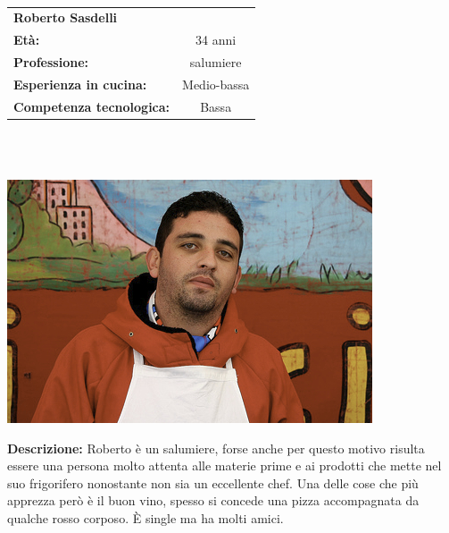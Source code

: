 \hrulefill\\
\begin{minipage}{.75\textwidth}
\begin{tabular}{l | c}
	\textbf{Roberto Sasdelli} & \\
	\textbf{Età:} & 34 anni\\
	\textbf{Professione:} & salumiere\\
	\textbf{Esperienza in cucina:} & Medio-bassa\\
	\textbf{Competenza tecnologica:} & Bassa\\
\end{tabular}\\\\
\end{minipage}
\begin{minipage}{.24\textwidth}
	\includegraphics[width=\textwidth]{img/personas/robertone}
\end{minipage}
	\textbf{Descrizione:}
	Roberto è un salumiere, forse anche per questo motivo risulta essere una
	persona molto attenta alle materie prime e ai prodotti che mette nel suo
	frigorifero nonostante non sia un eccellente chef.  Una delle cose che
	più apprezza però è il buon vino, spesso si concede una pizza
	accompagnata da qualche rosso corposo. È single ma ha molti amici.

